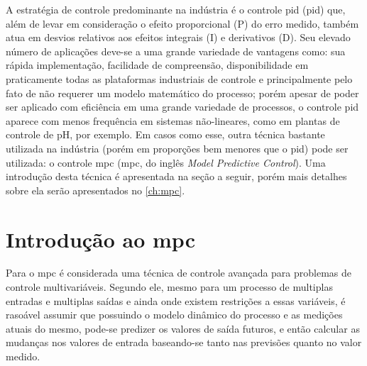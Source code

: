 A estratégia de controle predominante na indústria é o controle \acrshort{pid}
(\acrlong{pid}) que, além de levar em consideração o efeito proporcional (P) do erro
medido, também atua em desvios relativos aos efeitos integrais (I) e derivativos (D).
Seu elevado número de aplicações deve-se a uma grande variedade de vantagens como:
sua rápida implementação, facilidade de compreensão, disponibilidade em praticamente
todas as plataformas industriais de controle e principalmente pelo fato de não requerer
um modelo matemático do processo; porém apesar de poder ser aplicado com eficiência em
uma grande variedade de processos, o controle \acrshort{pid} aparece com menos frequência
em sistemas não-lineares, como em plantas de controle de pH, por exemplo. Em casos como
esse, outra técnica bastante utilizada na indústria (porém em proporções bem menores
que o \acrshort{pid}) pode ser utilizada: o controle \acrshort{mpc} (\acrlong{mpc},
do inglês \textit{Model Predictive Control}). Uma introdução desta técnica é apresentada
na seção a seguir, porém mais detalhes sobre ela serão apresentados no \cref{ch:mpc}.


\section{Introdução ao \acrshort{mpc}}
\label{sec:intro_mpc}

Para  o \acrlong{mpc} é considerada uma técnica de controle
avançada para problemas de controle multivariáveis. Segundo ele, mesmo para um processo
de multiplas entradas e multiplas saídas e ainda onde existem restrições a essas variáveis,
é rasoável assumir que possuindo o modelo dinâmico do processo e as medições atuais do
mesmo, pode-se predizer os valores de saída futuros, e então calcular as mudanças nos
valores de entrada baseando-se tanto nas previsões quanto no valor medido.

